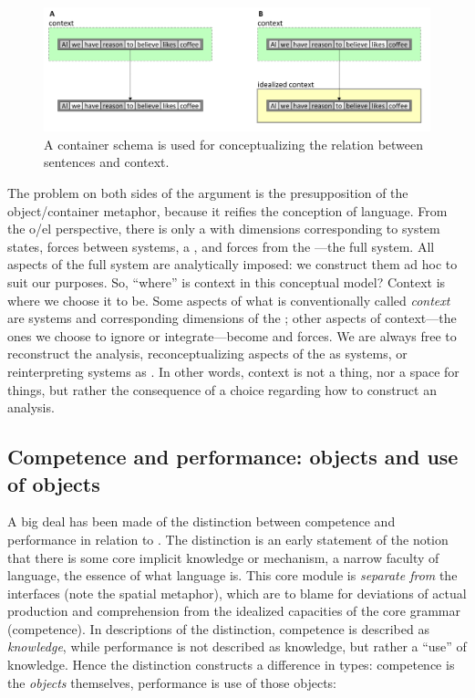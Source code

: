   
\begin{figure}
\includegraphics[width=\textwidth]{figures/Tilsen-img120.png}
\caption{A container schema is used for conceptualizing the relation between sentences and context.}
\label{fig:6:1}
\end{figure}
 

  The problem on both sides of the argument is the presupposition of the object/container metaphor, because it reifies the  conception of language. From the o/el perspective, there is only a  with dimensions corresponding to system states, forces between systems, a , and forces from the —the full system. All aspects of the full system are analytically imposed: we construct them ad hoc to suit our purposes. So, “where” is context in this conceptual model? Context is where we choose it to be. Some aspects of what is conventionally called \textit{context} are systems and corresponding dimensions of the ; other aspects of context—the ones we choose to ignore or integrate—become  and  forces. We are always free to reconstruct the analysis, reconceptualizing aspects of the  as systems, or reinterpreting systems as . In other words, context is not a thing, nor a space for things, but rather the consequence of a choice regarding how to construct an analysis.

\subsection{Competence and performance: objects and use of objects}

A big deal has been made of the distinction between competence and performance in relation to  \citep{Chomsky1965}. The distinction is an early statement of the notion that there is some core implicit knowledge or mechanism, a narrow faculty of language, the essence of what language is. This core module is \textit{separate from} the  interfaces (note the spatial metaphor), which are to blame for deviations of actual production and comprehension from the idealized capacities of the core grammar (competence). In descriptions of the distinction, competence is described as \textit{knowledge}, while performance is not described as knowledge, but rather a “use” of knowledge. Hence the distinction constructs a difference in types: competence is the \textit{objects} themselves, performance is use of those objects:

